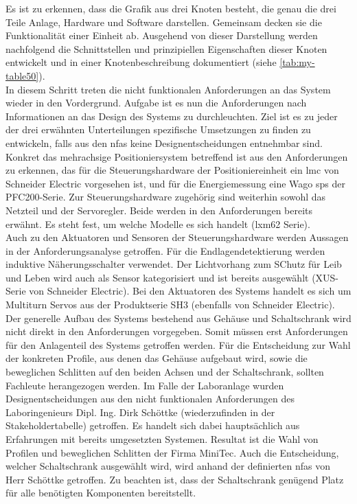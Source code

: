 \documentclass[../../../Bachelorarbeit.tex]{subfiles}
\begin{document}
Es ist zu erkennen, dass die Grafik aus drei Knoten besteht, die genau die drei Teile Anlage, Hardware und Software darstellen. Gemeinsam decken sie die Funktionalität einer Einheit ab. Ausgehend von dieser Darstellung werden nachfolgend die Schnittstellen und prinzipiellen Eigenschaften dieser Knoten entwickelt und in einer Knotenbeschreibung dokumentiert (siehe \autoref{tab:my-table50}). \\
In diesem Schritt treten die nicht funktionalen Anforderungen an das System wieder in den Vordergrund. Aufgabe ist es nun die Anforderungen nach Informationen an das Design des Systems zu durchleuchten. Ziel ist es zu jeder der drei erwähnten Unterteilungen spezifische Umsetzungen zu finden \bzw zu entwickeln, falls aus den \acp{nfa} keine Designentscheidungen entnehmbar sind. \\
Konkret das mehrachsige Positioniersystem betreffend ist aus den Anforderungen zu erkennen, das für die Steuerungshardware der Positioniereinheit ein \ac{lmc} von Schneider Electric vorgesehen ist, und für die Energiemessung eine Wago \ac{sps} der PFC200-Serie. Zur Steuerungshardware zugehörig sind weiterhin sowohl das Netzteil und der Servoregler. Beide werden in den Anforderungen bereits erwähnt. Es steht fest, um welche Modelle es sich handelt (\acs{lxm}62 Serie).\\ 
Auch zu den Aktuatoren und Sensoren der Steuerungshardware werden Aussagen in der Anforderungsanalyse getroffen. Für die Endlagendetektierung werden induktive Näherungsschalter verwendet. Der Lichtvorhang zum SChutz für Leib und Leben wird auch als Sensor kategorisiert und ist bereits ausgewählt (XUS-Serie von Schneider Electric). Bei den Aktuatoren des Systems handelt es sich um Multiturn Servos aus der Produktserie SH3 (ebenfalls von Schneider Electric). \\
Der generelle Aufbau des Systems bestehend aus Gehäuse und Schaltschrank wird nicht direkt in den Anforderungen vorgegeben. Somit müssen erst Anforderungen für den Anlagenteil des Systems getroffen werden. Für die Entscheidung zur Wahl der konkreten Profile, aus denen das Gehäuse aufgebaut wird, sowie die beweglichen Schlitten auf den beiden Achsen und der Schaltschrank, sollten Fachleute herangezogen werden. Im Falle der Laboranlage wurden Designentscheidungen aus den nicht funktionalen Anforderungen des Laboringenieurs Dipl. Ing. Dirk Schöttke (wiederzufinden in der Stakeholdertabelle) getroffen. Es handelt sich dabei hauptsächlich aus Erfahrungen mit bereits umgesetzten Systemen. Resultat ist die Wahl von Profilen und beweglichen Schlitten der Firma MiniTec. Auch die Entscheidung, welcher Schaltschrank ausgewählt wird, wird anhand der definierten \acp{nfa} von Herr Schöttke getroffen. Zu beachten ist, dass der Schaltschrank genügend Platz für alle benötigten Komponenten bereitstellt.\\
\end{document}
